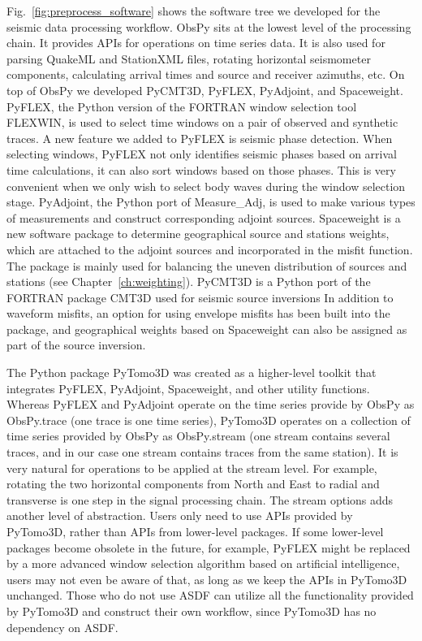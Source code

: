 Fig.~\ref{fig:preprocess_software} shows the software tree we developed
for the seismic data processing workflow.
ObsPy sits at the lowest level of the processing chain.
It provides APIs for operations on time series data. It is also used for
parsing QuakeML and StationXML files, rotating horizontal seismometer components, calculating arrival times and source and receiver azimuths, etc.
On top of ObsPy we developed PyCMT3D, PyFLEX, PyAdjoint, and Spaceweight.
PyFLEX, the Python version of the FORTRAN window selection tool FLEXWIN, is used to select time windows on a pair of observed
and synthetic traces.
A new feature we added to PyFLEX is seismic
phase detection.
When selecting windows, PyFLEX not only identifies seismic phases
based on arrival time calculations, it can also sort windows based on those phases.
This is very convenient when we only wish to select body waves during the window selection stage.
PyAdjoint, the Python port of Measure\_Adj, is used to make
various types of measurements and construct corresponding adjoint sources.
Spaceweight is a new software package to determine geographical source and stations weights,
which are attached to the adjoint sources and incorporated in the misfit function.
The package is mainly used for
balancing the uneven distribution of sources and stations (see Chapter~\ref{ch:weighting}).
PyCMT3D is a Python port of the FORTRAN package CMT3D used for seismic source inversions
In addition
to waveform misfits, an option for using envelope misfits has been built into the package,
and geographical weights based on Spaceweight can also be assigned as part of the source inversion.

The Python package PyTomo3D was created as a higher-level toolkit that integrates
PyFLEX, PyAdjoint, Spaceweight, and other utility functions.
Whereas PyFLEX and PyAdjoint operate on the time series provide by ObsPy as
ObsPy.trace (one trace is one time series),
PyTomo3D operates on a collection of time series provided by ObsPy as ObsPy.stream (one stream contains several traces, and in our case one stream
contains traces from the same station).
It is very natural for operations to be
applied at the stream level.
For example, rotating the two horizontal components 
from North and East to radial and transverse is one step in the signal processing
chain.
The stream options adds another level of abstraction.
Users only need to use APIs provided by PyTomo3D,
rather than APIs from lower-level packages.
If some lower-level packages become obsolete in the future, for example, PyFLEX might be
replaced by a more advanced window selection algorithm based on artificial intelligence,
users may not even be aware of that, as long as we keep the APIs in PyTomo3D unchanged. 
Those who do not use ASDF can utilize all the functionality provided by
PyTomo3D and construct their own workflow, since PyTomo3D has no dependency on ASDF.

